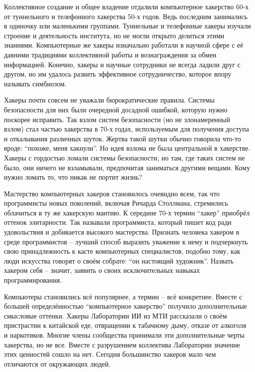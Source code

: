 Коллективное создание и общее владение отдалили компьютерное хакерство 60-х от туннельного и телефонного хакерства 50-х годов. Ведь последним занимались в одиночку или маленькими группами. Туннельные и телефонные хакеры изучали строение и деятельность института, но не могли открыто делиться этими знаниями. Компьютерные же хакеры изначально работали в научной сфере с её давними традициями коллективной работы и вознаграждения за обмен информацией. Конечно, хакеры и научные сотрудники не всегда ладили друг с другом, но им удалось развить эффективное сотрудничество, которое впору называть симбиозом.

Хакеры почти совсем не уважали бюрократические правила. Системы безопасности для них были очередной досадной ошибкой, которую нужно поскорее исправить. Так взлом систем безопасности (но не злонамеренный взлом) стал частью хакерства в 70-х годах, используемым для получения доступа и откалывания различных шуток. Жертва такой шутки обычно говорила что-то вроде: ``похоже, меня хакнули''. Но идея взлома не была центральной в хакерстве. Хакеры с гордостью ломали системы безопасности, но там, где таких систем не было, они ничего не взламывали, предпочитая заниматься другими вещами. Кому нужно ломать то, что никак не портит жизнь?

Мастерство компьютерных хакеров становилось очевидно всем, так что программисты новых поколений, включая Ричарда Столлмана, стремились облачиться в ту же хакерскую мантию. К середине 70-х термин ``хакер'' приобрёл оттенок элитарности. Так называли программиста, который пишет код ради удовольствия и добивается высокого мастерства. Признать человека хакером в среде программистов -- лучший способ выразить уважение к нему и подчеркнуть свою принадлежность к касте компьютерных специалистов, подобно тому, как люди искусства говорят о своём собрате: ``он настоящий художник''. Назвать хакером себя -- значит, заявить о своих исключительных навыках программирования.

Компьютеры становились всё популярнее, а термин -- всё конкретнее. Вместе с большей определённостью ``компьютерное хакерство'' получило дополнительные смысловые оттенки. Хакеры Лаборатории ИИ из МТИ рассказали о своём пристрастии к китайской еде, отвращении к табачному дыму, отказе от алкоголя и наркотиков. Многие члены сообщества принимали эти дополнительные черты хакерства, но не все. Вместе с разрушением коллектива Лаборатории значение этих ценностей сошло на нет. Сегодня большинство хакеров мало чем отличаются от окружающих людей.

